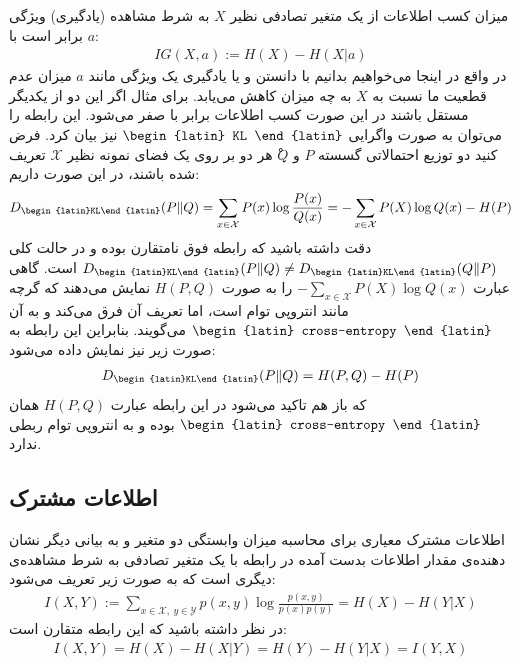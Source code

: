 میزان کسب اطلاعات از یک متغیر تصادفی نظیر $X$ به شرط مشاهده (یادگیری) ویژگی $a$ برابر است با:
\begin{align*}
    IG(X,a):= H(X) - H(X|a)
\end{align*}
در واقع در اینجا می‌خواهیم بدانیم با دانستن و یا یادگیری یک ویژگی مانند $a$ میزان عدم قطعیت ما نسبت به $X$ به چه میزان کاهش می‌یابد. برای مثال اگر این دو از یکدیگر مستقل باشند در این صورت کسب اطلاعات برابر با صفر می‌شود.
این رابطه‌ را می‌توان به صورت واگرایی $\text{\begin{latin}
    KL
\end{latin}}$
نیز بیان کرد. فرض کنید دو توزیع احتمالاتی گسسته $P$ و $ْQ$ هر دو بر روی یک فضای نمونه نظیر $\mathcal{X}$ تعریف شده باشند، در این صورت داریم:
\begin{align*}
    D_\text{\begin{latin}KL\end{latin}}(P \| Q) = \sum_{x\in \mathcal{X}}P(x) \log \frac{P(x)}{Q(x)} = -\sum_{x\in \mathcal{X}} P(X)\log Q(x) - H(P)
\end{align*}
دقت داشته باشید که رابطه فوق نامتقارن بوده و در حالت کلی $D_\text{\begin{latin}KL\end{latin}}(P\|Q)\ne D_\text{\begin{latin}KL\end{latin}}(Q\|P)$ است. گاهی عبارت $-\sum_{x\in \mathcal{X}} P(X)\log Q(x)$ را به صورت $H(P,Q)$ نمایش می‌دهند که گرچه مانند انتروپی توام است، اما تعریف آن فرق می‌کند و به آن $\text{\begin{latin}
    cross-entropy
\end{latin}}$ می‌گویند. بنابراین این رابطه به صورت زیر نیز نمایش داده‌ می‌شود:
\begin{align*}
    D_\text{\begin{latin}KL\end{latin}}(P \| Q) = H(P,Q) - H(P)
\end{align*}
که باز هم تاکید می‌شود در این رابطه عبارت $H(P,Q)$ همان $\text{\begin{latin}
    cross-entropy
\end{latin}}$ بوده و به انتروپی توام ربطی ندارد.

\subsection{اطلاعات مشترک}

اطلاعات مشترک معیاری برای محاسبه میزان وابستگی دو متغیر و به بیانی دیگر نشان دهنده‌ی مقدار اطلاعات بدست آمده در رابطه با یک متغیر تصادفی به شرط مشاهده‌ی دیگری است که به صورت زیر تعریف می‌شود:
\begin{align*}
    I(X,Y) := \sum_{x\in \mathcal{X},~y\in \mathcal{Y}}p(x,y) \log \frac{p(x,y)}{p(x)p(y)} = H(X) - H(Y|X) 
\end{align*}
در نظر داشته باشید که این رابطه متقارن است:
\begin{align*}
    I(X,Y) = H(X) - H(X|Y) = H(Y) - H(Y|X) = I(Y,X)
\end{align*}